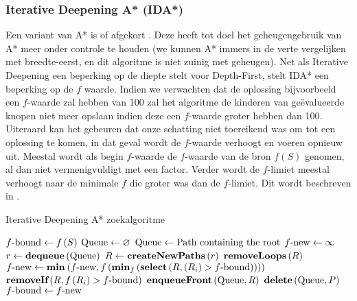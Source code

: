 \subsubsection{Iterative Deepening A* (IDA*)}
Een variant van A* is  of afgekort . Deze heeft tot doel het geheugengebruik van A* meer onder controle te houden (we kunnen A* immers in de verte vergelijken met breedte-eerst, en dit algoritme is niet zuinig met geheugen). Net als Iterative Deepening een beperking op de diepte stelt voor Depth-First, stelt IDA* een beperking op de $f$ waarde. Indien we verwachten dat de oplossing bijvoorbeeld een $f$-waarde zal hebben van 100 zal het algoritme de kinderen van ge\"evalueerde knopen niet meer opslaan indien deze een $f$-waarde groter hebben dan 100. Uiteraard kan het gebeuren dat onze schatting niet toereikend was om tot een oplossing te komen, in dat geval wordt de $f$-waarde verhoogt en voeren  opnieuw uit. Meestal wordt als begin $f$-waarde de $f$-waarde van de bron $f\left(S\right)$ genomen, al dan niet vermenigvuldigt met een factor. Verder wordt de $f$-limiet meestal verhoogt naar de minimale $f$ die groter was dan de $f$-limiet. Dit wordt beschreven in .
\begin{algorithm}[htb]                      %
\caption{Iterative Deepening A* zoekalgoritme}          %
\label{alg:iterativeDeepeningAStar}                           %
\begin{algorithmic}[1]                    %
\STATE $\mbox{$f$-bound}\leftarrow f\left(S\right)$
\STATE $\mbox{Queue}\leftarrow\varnothing$
\WHILE{$\neg\goalreached{\queue}$}
\STATE{}
\STATE $\mbox{Queue}\leftarrow\mbox{Path containing the root}$
\STATE $\mbox{$f$-new}\leftarrow\infty$
\WHILE{$\notempty{\queue}$}
\STATE $r\leftarrow\mbox{\bf dequeue}\left( \mbox{Queue} \right)$
\STATE $R\leftarrow\mbox{\bf createNewPaths}\left( r \right)$
\STATE $\mbox{\bf removeLoops}\left( R \right)$
\STATE $\mbox{$f$-new}\leftarrow\mbox{\bf min}_{}\left( \mbox{$f$-new},f\left(\mbox{\bf min}_{f}\left( \mbox{\bf select}\left( R,\left(R_i\right)>\mbox{$f$-bound} \right) \right)\right) \right)$
\STATE $\mbox{\bf removeIf}\left( R,f\left(R_i\right)>\mbox{$f$-bound} \right)$
\STATE{}
\STATE{}
\STATE $\mbox{\bf enqueueFront}\left( \mbox{Queue},R \right)$
\STATE{}
\STATE $\mbox{\bf delete}\left( \mbox{Queue},P \right)$
\ENDIF
\ENDWHILE
\STATE{}
\STATE $\mbox{$f$-bound}\leftarrow\mbox{$f$-new}$
\ENDWHILE
\end{algorithmic}
\end{algorithm}
